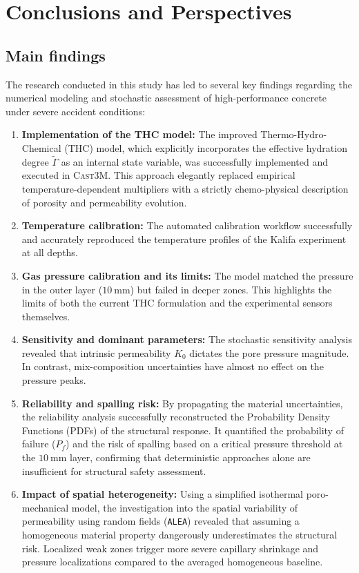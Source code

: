 \chapter{Conclusions and Perspectives} \label{chapter6} %

\section{Main findings}
The research conducted in this study has led to several key findings regarding the numerical modeling and stochastic assessment of high-performance concrete under severe accident conditions:

\begin{enumerate}
    \item \textbf{Implementation of the THC model:} The improved Thermo-Hydro-Chemical (THC) model, which explicitly incorporates the effective hydration degree $\tilde{\Gamma}$ as an internal state variable, was successfully implemented and executed in \textsc{Cast3M}. This approach elegantly replaced empirical temperature-dependent multipliers with a strictly chemo-physical description of porosity and permeability evolution.
    \item \textbf{Temperature calibration:} The automated calibration workflow successfully and accurately reproduced the temperature profiles of the Kalifa experiment at all depths.
    \item \textbf{Gas pressure calibration and its limits:} The model matched the pressure in the outer layer ($10~\mathrm{mm}$) but failed in deeper zones. This highlights the limits of both the current THC formulation and the experimental sensors themselves.
    \item \textbf{Sensitivity and dominant parameters:} The stochastic sensitivity analysis revealed that intrinsic permeability $K_0$ dictates the pore pressure magnitude. In contrast, mix-composition uncertainties have almost no effect on the pressure peaks.
    \item \textbf{Reliability and spalling risk:} By propagating the material uncertainties, the reliability analysis successfully reconstructed the Probability Density Functions (PDFs) of the structural response. It quantified the probability of failure ($P_f$) and the risk of spalling based on a critical pressure threshold at the $10~\mathrm{mm}$ layer, confirming that deterministic approaches alone are insufficient for structural safety assessment.
    \item \textbf{Impact of spatial heterogeneity:} Using a simplified isothermal poro-mechanical model, the investigation into the spatial variability of permeability using random fields (\texttt{ALEA}) revealed that assuming a homogeneous material property dangerously underestimates the structural risk. Localized weak zones trigger more severe capillary shrinkage and pressure localizations compared to the averaged homogeneous baseline.
\end{enumerate}

